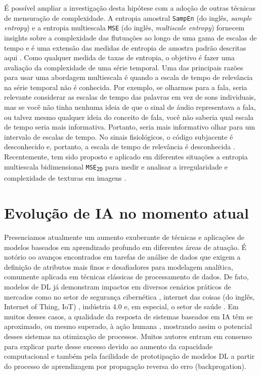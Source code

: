 \documentclass[
	12pt,				%
	openany,oneside,
	a4paper,			%
	english,			%
	brazil,				%
	]{abntex2}
\begin{document}
É possível ampliar a investigação desta hipótese com a adoção de outras técnicas de mensuração de complexidade. A entropia amostral \texttt{SampEn} (do inglês, \textit{sample entropy}) e a entropia multiescala \texttt{MSE} (do inglês, \textit{multiscale entropy}) fornecem insights sobre a complexidade das flutuações ao longo de uma gama de escalas de tempo e é uma extensão das medidas de entropia de amostra padrão descritas aqui \cite{c32,c31}. Como qualquer medida de taxas de entropia, o objetivo é fazer uma avaliação da complexidade de uma série temporal. Uma das principais razões para usar uma abordagem multiescala é quando a escala de tempo de relevância na série temporal não é conhecida. Por exemplo, se olharmos para a fala, seria relevante considerar as escalas de tempo das palavras em vez de sons individuais, mas se você não tinha nenhuma ideia de que o sinal de áudio representava a fala, ou talvez mesmo qualquer ideia do conceito de fala, você não saberia qual escala de tempo seria mais informativa. Portanto, seria mais informativo olhar para um intervalo de escalas de tempo. No sinais fisiológicos, o código subjacente é desconhecido e, portanto, a escala de tempo de relevância é desconhecida \cite{c33, c34}. Recentemente, tem sido proposto e aplicado em diferentes situações a entropia multiescala bidimensional \texttt{MSE\textsubscript{2D}} para medir e analisar a irregularidade e complexidade de texturas em imagens \cite{c35}.

\section{Evolução de IA no momento atual}

Presenciamos atualmente um aumento exuberante de técnicas e aplicações de modelos baseados em aprendizado profundo em diferentes áreas de atuação. É notório oo avanços encontrados em tarefas de análise de dados que exigem a definição de atributos mais finos e desafiadores para modelagem analítica, comumente aplicada em técnicas clássicas de processamento de dados. De fato, modelos de DL já demonstram impactos em diversos cenários práticos de mercados como no setor de segurança cibernética \cite{Berman2019}, internet das coisas (do inglês, Internet of Thing, IoT) \cite{Mohammadi2018,Li2018}, indústria 4.0 \cite{Aggarwal2022} e, em especial, o setor de saúde \cite{Fernando2022,Hafiz2020,Chen2020,Faust2018}. Em muitos desses casos, a qualidade da resposta de sistemas baseados em IA têm se aproximado, ou mesmo superado, à ação humana \cite{Philpotts2023,Grace2018}, mostrando assim o potencial desses sistemas na otimização de processos. Muitos autores entram em consenso para explicar parte desse sucesso devido ao aumento da capacidade computacional e também pela facilidade de prototipação de modelos DL a partir do processo de aprendizagem por propagação reversa do erro (backprogation).
\end{document}
